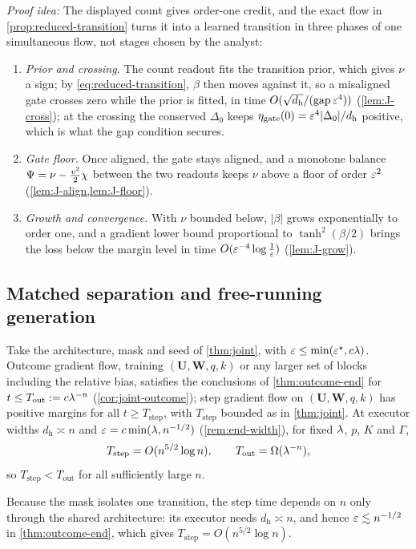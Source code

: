 \emph{Proof idea:} The displayed count gives order-one credit, and the exact flow in \cref{prop:reduced-transition} turns it into a
learned transition in three phases of one simultaneous flow, not stages chosen by the analyst:
\begin{enumerate}[label=(\arabic*),leftmargin=*,itemsep=0pt,topsep=2pt]
\item \emph{Prior and crossing.} The count readout fits the transition prior, which gives $\nu$ a sign; by \cref{eq:reduced-transition},
$\beta$ then moves against it, so a misaligned gate crosses zero while the prior is fitted, in time $O(\sqrt{d_{\mathrm h}}/(\mathrm{gap}\,\varepsilon^4))$ (\cref{lem:J-cross});
at the crossing the conserved $\Delta_0$ keeps $\eta_{\mathrm{gate}}(0)=\varepsilon^4|\Delta_0|/d_{\mathrm h}$ positive, which is what the gap condition secures.
\item \emph{Gate floor.} Once aligned, the gate stays aligned, and a monotone balance $\Psi=\nu-\frac{v^2}{2}\chi$ between the two readouts keeps $\nu$ above a floor
of order $\varepsilon^2$ (\cref{lem:J-align,lem:J-floor}).
\item \emph{Growth and convergence.} With $\nu$ bounded below, $|\beta|$ grows exponentially to order one, and a gradient lower bound proportional
to $\tanh^2(\beta/2)$ brings the loss below the margin level in time $O(\varepsilon^{-4}\log\frac1{\varepsilon})$ (\cref{lem:J-grow}).
\end{enumerate}

\subsection{Matched separation and free-running generation}

\begin{corollary}
\label{cor:matched}
Take the architecture, mask and seed of \cref{thm:joint}, with $\varepsilon\le\min(\varepsilon^\star,c\lambda)$. Outcome gradient flow, training
$(\mathbf U,\mathbf W,q,k)$ or any larger set of blocks including the relative bias, satisfies the conclusions of \cref{thm:outcome-end} for
$t\le T_{\mathrm{out}}:=c\lambda^{-n}$ (\cref{cor:joint-outcome}); step gradient flow on $(\mathbf U,\mathbf W,q,k)$ has positive margins for all
$t\ge T_{\mathrm{step}}$, with $T_{\mathrm{step}}$ bounded as in \cref{thm:joint}. At executor widths $d_{\mathrm h}\asymp n$ and
$\varepsilon=c\min(\lambda,n^{-1/2})$ (\cref{rem:end-width}), for fixed $\lambda$, $p$, $K$ and $\Gamma$,
\[
 T_{\mathrm{step}}=O(n^{5/2}\log n),\qquad T_{\mathrm{out}}=\Omega(\lambda^{-n}),
\]
so $T_{\mathrm{step}}<T_{\mathrm{out}}$ for all sufficiently large $n$.
\end{corollary}
Because the mask isolates one transition, the step time depends on $n$ only through the shared architecture: its executor needs
$d_{\mathrm h}\asymp n$, and hence $\varepsilon\lesssim n^{-1/2}$ in \cref{thm:outcome-end}, which gives $T_{\mathrm{step}}=O(n^{5/2}\log n)$.

